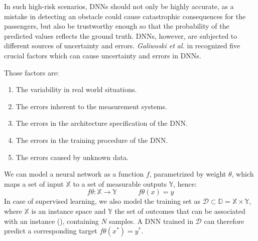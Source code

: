 In such high-risk scenarios, DNNs should not only be highly accurate, as a mistake in detecting an obstacle could cause catastrophic consequences for the passengers, but also be trustworthy enough so that the probability of the predicted values reflects the ground truth. DNNs, however, are subjected to different sources of uncertainty and errors. \textit{Galiwoski et al.} in \cite{gawlikowski2021survey} recognized five crucial factors which can cause uncertainty and errors in DNNs.\\\hfill

Those factors are:

\begin{enumerate}[label=\Roman*.]
    \item The variability in real world situations. 
    \item The errors inherent to the measurement systems.
    \item The errors in the architecture specification of the DNN.
    \item The errors in the training procedure of the DNN.
    \item The errors caused by unknown data.
\end{enumerate}
We can model a neural network as a function $f$, parametrized by weight $\theta$, which maps a set of input $\mathbb{X}$ to a set of measurable outputs $\mathbb{Y}$, hence:
\begin{equation}
    f\theta : \mathbb{X} \rightarrow \mathbb{Y} \quad\quad\quad
    f\theta(x) = y
    \label{eq:DNN_model}
\end{equation}
In case of supervised learning, we also model the training set as $\mathcal{D} \subset \mathbb{D} = \mathbb{X} \times \mathbb{Y}$, where $\mathbb{X}$ is an instance space and $\mathbb{Y}$ the set of outcomes that can be associated with an instance (\cite{uncertainity_classi}), containing $N$ samples. A DNN trained in $\mathcal{D}$ can therefore predict a corresponding target $f\theta(x^*) = y^*$.\\
